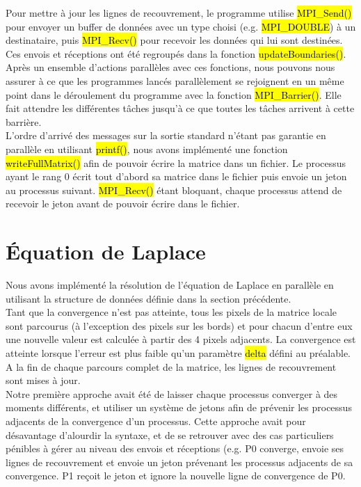\documentclass[a4paper,table]{article}
\begin{document}
Pour mettre à jour les lignes de recouvrement, le programme utilise
\hl{MPI\_Send()} pour envoyer un buffer de données avec un type choisi
(e.g. \hl{MPI\_DOUBLE}) à un destinataire, puis \hl{MPI\_Recv()} pour recevoir
les données qui lui sont destinées. Ces envois et réceptions ont été regroupés
dans la fonction \hl{updateBoundaries()}. \\

Après un ensemble d'actions parallèles avec ces fonctions, nous pouvons nous
assurer à ce que les programmes lancés parallèlement se rejoignent en un même
point dans le déroulement du programme avec la fonction \hl{MPI\_Barrier()}.
Elle fait attendre les différentes tâches jusqu'à ce que toutes les tâches
arrivent à cette barrière. \\

L'ordre d'arrivé des messages sur la sortie standard n'étant pas garantie en
parallèle en utilisant \hl{printf()}, nous avons implémenté une fonction
\hl{writeFullMatrix()} afin de pouvoir écrire la matrice dans un fichier.
Le processus ayant le rang 0 écrit tout d'abord sa matrice dans le fichier
puis envoie un jeton au processus suivant. \hl{MPI\_Recv()} étant bloquant,
chaque processus attend de recevoir le jeton avant de pouvoir écrire dans le
fichier.
\newpage

\section{Équation de Laplace}

Nous avons implémenté la résolution de l'équation de Laplace en parallèle en
utilisant la structure de données définie dans la section précédente.\\

Tant que la convergence n'est pas atteinte, tous les pixels de la matrice
locale sont parcourus (à l'exception des pixels sur les bords) et pour chacun
d'entre eux une nouvelle valeur est calculée à partir des 4 pixels adjacents.
La convergence est atteinte lorsque l'erreur est plus faible qu'un paramètre
\hl{delta} défini au préalable. A la fin de chaque parcours complet de la
matrice, les lignes de recouvrement sont mises à jour.\\

Notre première approche avait été de laisser chaque processus converger à des
moments différents, et utiliser un système de jetons afin de prévenir les
processus adjacents de la convergence d'un processus. Cette approche avait
pour désavantage d'alourdir la syntaxe, et de se retrouver avec des cas
particuliers pénibles à gérer au niveau des envois et réceptions (e.g.
P0 converge, envoie ses lignes de recouvrement et envoie un jeton prévenant
les processus adjacents de sa convergence. P1 reçoit le jeton et ignore la
nouvelle ligne de convergence de P0.\\
\end{document}
